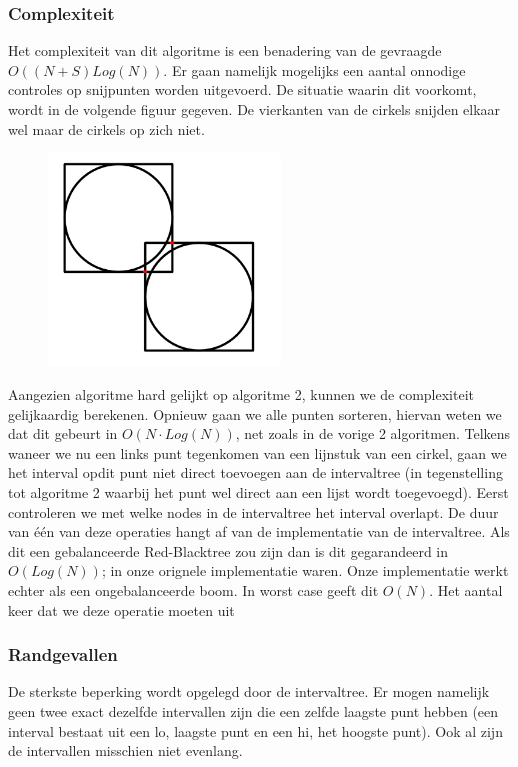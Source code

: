\documentclass[11pt,a4paper]{article}
\begin{document}
\subsubsection{Complexiteit}
Het complexiteit van dit algoritme is een benadering van de gevraagde $O((N+S)Log(N))$. Er gaan namelijk mogelijks een aantal onnodige controles op snijpunten worden uitgevoerd. De situatie waarin dit voorkomt, wordt in de volgende figuur gegeven. De vierkanten van de cirkels snijden elkaar wel maar de cirkels op zich niet.
\begin{figure}[H]
\centering
\includegraphics[width=0.55\textwidth]{onnodigecheck.png}
\end{figure}
Aangezien algoritme hard gelijkt op algoritme 2, kunnen we de complexiteit gelijkaardig berekenen. Opnieuw gaan we alle punten sorteren, hiervan weten we dat dit gebeurt in $O(N\cdot Log(N))$, net zoals in de vorige 2 algoritmen. Telkens waneer we nu een links punt tegenkomen van een lijnstuk van een cirkel, gaan we het interval opdit punt niet direct toevoegen aan de intervaltree (in tegenstelling tot algoritme 2 waarbij het punt wel direct aan een lijst wordt toegevoegd). Eerst controleren we met welke nodes in de intervaltree het interval overlapt. De duur van \'e\'en van deze operaties hangt af van de implementatie van de intervaltree. Als dit een gebalanceerde Red-Blacktree zou zijn dan is dit gegarandeerd in $O(Log(N))$; in onze orignele implementatie waren. Onze implementatie werkt echter als een ongebalanceerde boom. In worst case geeft dit $O(N)$. Het aantal keer dat we deze operatie moeten uit
\subsubsection{Randgevallen}
De sterkste beperking wordt opgelegd door de intervaltree. Er mogen namelijk geen twee exact dezelfde intervallen zijn die een zelfde laagste punt hebben (een interval bestaat uit een lo, laagste punt en een hi, het hoogste punt). Ook al zijn de intervallen misschien niet evenlang. 
\end{document}
